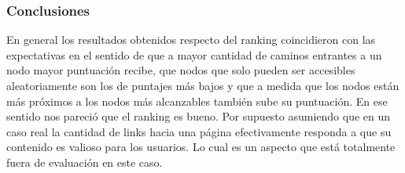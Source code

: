 \subsubsection*{Conclusiones}

En general los resultados obtenidos respecto del ranking coincidieron con las expectativas en el sentido de que a mayor cantidad de caminos entrantes a un nodo mayor puntuación recibe, que nodos que solo pueden ser accesibles aleatoriamente son los de puntajes más bajos y que a medida  que los nodos están más próximos a los nodos más alcanzables también sube su puntuación. En ese sentido nos pareció que el ranking es bueno. Por supuesto asumiendo que en un caso real la cantidad de links hacia una página efectivamente responda a que su contenido es valioso para los usuarios. Lo cual es un aspecto que está totalmente fuera de evaluación en este caso.
